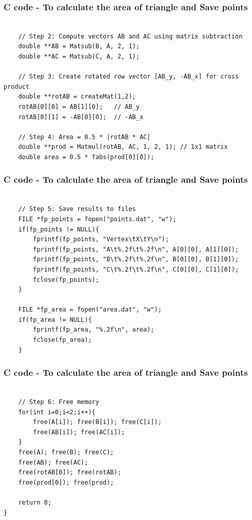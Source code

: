 \documentclass{beamer}
\begin{document}
\begin{frame}[fragile]                            
\frametitle{C code - To calculate the area of triangle and Save points}                
\begin{lstlisting}

    // Step 2: Compute vectors AB and AC using matrix subtraction
    double **AB = Matsub(B, A, 2, 1);
    double **AC = Matsub(C, A, 2, 1);

    // Step 3: Create rotated row vector [AB_y, -AB_x] for cross product
    double **rotAB = createMat(1,2);
    rotAB[0][0] = AB[1][0];   // AB_y
    rotAB[0][1] = -AB[0][0];  // -AB_x

    // Step 4: Area = 0.5 * |rotAB * AC|
    double **prod = Matmul(rotAB, AC, 1, 2, 1); // 1x1 matrix
    double area = 0.5 * fabs(prod[0][0]);
    \end{lstlisting}

\end{frame}


\begin{frame}[fragile]                            
\frametitle{C code - To calculate the area of triangle and Save points}                
\begin{lstlisting}

    // Step 5: Save results to files
    FILE *fp_points = fopen("points.dat", "w");
    if(fp_points != NULL){
        fprintf(fp_points, "Vertex\tX\tY\n");
        fprintf(fp_points, "A\t%.2f\t%.2f\n", A[0][0], A[1][0]);
        fprintf(fp_points, "B\t%.2f\t%.2f\n", B[0][0], B[1][0]);
        fprintf(fp_points, "C\t%.2f\t%.2f\n", C[0][0], C[1][0]);
        fclose(fp_points);
    }

    FILE *fp_area = fopen("area.dat", "w");
    if(fp_area != NULL){
        fprintf(fp_area, "%.2f\n", area);
        fclose(fp_area);
    }
    \end{lstlisting}

\end{frame}


\begin{frame}[fragile]                            
\frametitle{C code - To calculate the area of triangle and Save points}                
\begin{lstlisting}

    // Step 6: Free memory
    for(int i=0;i<2;i++){
        free(A[i]); free(B[i]); free(C[i]);
        free(AB[i]); free(AC[i]);
    }
    free(A); free(B); free(C);
    free(AB); free(AC);
    free(rotAB[0]); free(rotAB);
    free(prod[0]); free(prod);

    return 0;
}

\end{lstlisting}
\end{frame}
\end{document}
